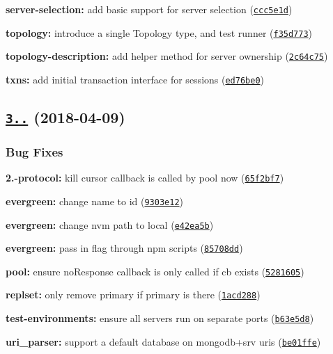 \begin{DoxyItemize}
\item {\bfseries server-\/selection\+:} add basic support for server selection (\href{https://github.com/mongodb-js/mongodb-core/commit/ccc5e1d}{\tt ccc5e1d})
\item {\bfseries topology\+:} introduce a single Topology type, and test runner (\href{https://github.com/mongodb-js/mongodb-core/commit/f35d773}{\tt f35d773})
\item {\bfseries topology-\/description\+:} add helper method for server ownership (\href{https://github.com/mongodb-js/mongodb-core/commit/2c64c75}{\tt 2c64c75})
\item {\bfseries txns\+:} add initial transaction interface for sessions (\href{https://github.com/mongodb-js/mongodb-core/commit/ed76be0}{\tt ed76be0})
\end{DoxyItemize}

\label{_3.0.6}%
 \subsection*{\href{https://github.com/mongodb-js/mongodb-core/compare/v3.0.5...v3.0.6}{\tt 3..} (2018-\/04-\/09)}

\subsubsection*{Bug Fixes}


\begin{DoxyItemize}
\item {\bfseries 2.-\/protocol\+:} kill cursor callback is called by pool now (\href{https://github.com/mongodb-js/mongodb-core/commit/65f2bf7}{\tt 65f2bf7})
\item {\bfseries evergreen\+:} change name to id (\href{https://github.com/mongodb-js/mongodb-core/commit/9303e12}{\tt 9303e12})
\item {\bfseries evergreen\+:} change nvm path to local (\href{https://github.com/mongodb-js/mongodb-core/commit/e42ea5b}{\tt e42ea5b})
\item {\bfseries evergreen\+:} pass in flag through npm scripts (\href{https://github.com/mongodb-js/mongodb-core/commit/85708dd}{\tt 85708dd})
\item {\bfseries pool\+:} ensure no\+Response callback is only called if cb exists (\href{https://github.com/mongodb-js/mongodb-core/commit/5281605}{\tt 5281605})
\item {\bfseries replset\+:} only remove primary if primary is there (\href{https://github.com/mongodb-js/mongodb-core/commit/1acd288}{\tt 1acd288})
\item {\bfseries test-\/environments\+:} ensure all servers run on separate ports (\href{https://github.com/mongodb-js/mongodb-core/commit/b63e5d8}{\tt b63e5d8})
\item {\bfseries uri\+\_\+parser\+:} support a default database on mongodb+srv uris (\href{https://github.com/mongodb-js/mongodb-core/commit/be01ffe}{\tt be01ffe})
\end{DoxyItemize}

